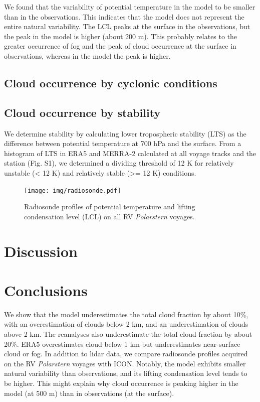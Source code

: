 \documentclass[12pt,a4paper]{article}
\begin{document}
We found that the variability of potential temperature in the model to be
smaller than in the observations. This indicates that the model does not
represent the entire natural variability. The LCL peaks at the surface in the
observations, but the peak in the model is higher (about 200 m). This probably
relates to the greater occurrence of fog and the peak of cloud occurrence at
the surface in observations, whereas in the model the peak is higher.

\subsection{Cloud occurrence by cyclonic conditions}

\subsection{Cloud occurrence by stability}

We determine stability by calculating lower tropospheric stability (LTS)
as the difference between potential temperature at 700 hPa and the surface.
From a histogram of LTS in ERA5 and MERRA-2 calculated at all voyage tracks
and the station (Fig. S1), we determined a dividing threshold of 12 K for
relatively unstable (< 12 K) and relatively stable (>= 12 K) conditions.

\begin{figure}
\centering
\texttt{[image: img/radiosonde.pdf]}
\caption{Radiosonde proﬁles of potential temperature and lifting condensation
level (LCL) on all RV \emph{Polarstern} voyages.}
\label{fig:radiosonde}
\end{figure}

\section{Discussion}

\section{Conclusions}

We show that the model underestimates the total cloud fraction by about 10\%,
with an overestimation of clouds below 2 km, and an underestimation of clouds
above 2 km. The reanalyses also underestimate the total cloud fraction by about
20\%.  ERA5 overestimates cloud below 1 km but underestimates near-surface
cloud or fog. In addition to lidar data, we compare radiosonde profiles
acquired on the RV \textit{Polarstern} voyages with ICON. Notably, the model
exhibits smaller natural variability than observations, and its lifting
condensation level tends to be higher. This might explain why cloud occurrence
is peaking higher in the model (at 500 m) than in observations (at the
surface).
\end{document}
